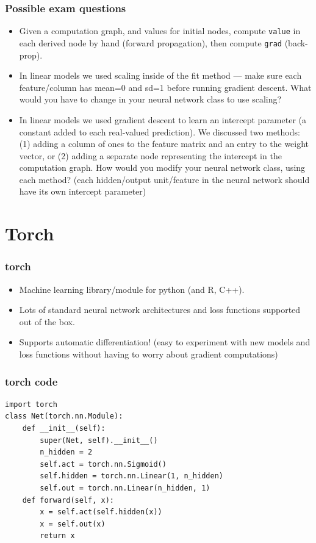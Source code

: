 \documentclass{beamer}
\begin{document}
\begin{frame}
  \frametitle{Possible exam questions}
  \begin{itemize}
  \item Given a computation graph, and values for initial nodes,
    compute \texttt{value} in each derived node by hand (forward
    propagation), then compute \texttt{grad} (back-prop).
  \item In linear models we used scaling inside of the fit method ---
    make sure each feature/column has mean=0 and sd=1 before running
    gradient descent. What would you have to change in your neural
    network class to use scaling?
  \item In linear models we used gradient descent to learn an
    intercept parameter (a constant added to each real-valued
    prediction). We discussed two methods: (1) adding a column of ones
    to the feature matrix and an entry to the weight vector, or (2)
    adding a separate node representing the intercept in the
    computation graph. How would you modify your neural network class,
    using each method? (each hidden/output unit/feature in the neural
    network should have its own intercept parameter)
  \end{itemize}
\end{frame}

\section{Torch}

\begin{frame}
  \frametitle{torch}
  \begin{itemize}
  \item Machine learning library/module for python (and R, C++).
  \item Lots of standard neural network architectures and loss
    functions supported out of the box.
  \item Supports automatic differentiation! (easy to experiment with
    new models and loss functions without having to worry about
    gradient computations)
  \end{itemize}
\end{frame}

\begin{frame}[fragile]
  \frametitle{torch code}
\begin{verbatim}
import torch
class Net(torch.nn.Module):
    def __init__(self):
        super(Net, self).__init__()
        n_hidden = 2
        self.act = torch.nn.Sigmoid()
        self.hidden = torch.nn.Linear(1, n_hidden)
        self.out = torch.nn.Linear(n_hidden, 1)
    def forward(self, x):
        x = self.act(self.hidden(x))
        x = self.out(x)
        return x
\end{verbatim}
\end{frame}
\end{document}
